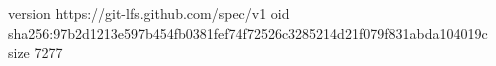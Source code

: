 version https://git-lfs.github.com/spec/v1
oid sha256:97b2d1213e597b454fb0381fef74f72526c3285214d21f079f831abda104019c
size 7277
